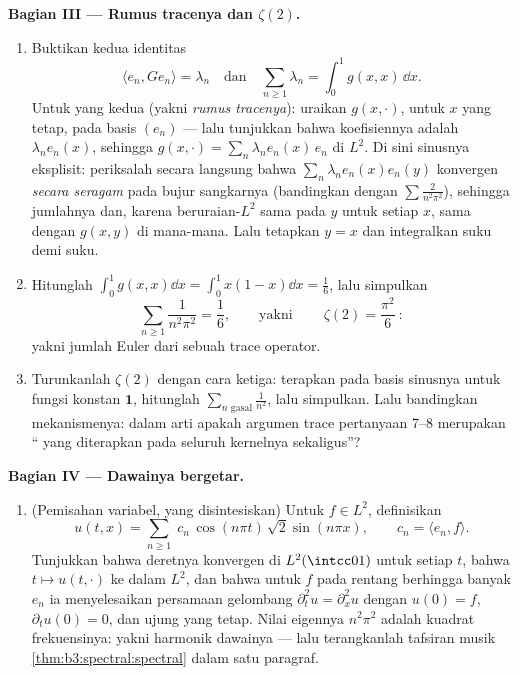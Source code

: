 \begin{problem}
\medskip
\noindent\textbf{Bagian III --- Rumus tracenya dan
$\zeta(2)$.}
\begin{enumerate}[resume]
  \item Buktikan kedua identitas
        \[
        \langle e_n, Ge_n\rangle = \lambda_n
        \quad\text{dan}\quad
        \sum_{n\geq1}\lambda_n = \int_0^1 g(x,x)\,\dd x .
        \]
        Untuk yang kedua (yakni \emph{rumus tracenya}): uraikan
        $g(x, \cdot)$, untuk $x$ yang tetap, pada basis $(e_n)$ ---
        lalu tunjukkan bahwa koefisiennya adalah $\lambda_ne_n(x)$, sehingga
        $g(x, \cdot) = \sum_n\lambda_ne_n(x)\,e_n$ di
        $L^2$. Di sini sinusnya eksplisit: periksalah secara langsung
        bahwa $\sum_n\lambda_ne_n(x)e_n(y)$ konvergen
        \emph{secara seragam} pada bujur sangkarnya (bandingkan dengan $\sum
        \frac2{n^2\pi^2}$), sehingga jumlahnya  dan, karena
        beruraian-$L^2$ sama pada $y$ untuk setiap $x$, sama dengan
        $g(x,y)$ di mana-mana. Lalu tetapkan $y = x$ dan integralkan suku demi
        suku.
  \item Hitunglah $\int_0^1g(x,x)\dd x = \int_0^1x(1-x)\dd x =
        \frac16$, lalu simpulkan
        \[
        \sum_{n\geq1}\frac{1}{n^2\pi^2} = \frac16,
        \qquad\text{yakni}\qquad
        \boxed{\ \zeta(2) = \frac{\pi^2}{6}\ } :
        \]
        yakni jumlah Euler dari sebuah trace operator.
  \item Turunkanlah $\zeta(2)$ dengan cara ketiga: terapkan  pada
        basis sinusnya untuk fungsi konstan $\mathbf 1$,
        hitunglah $\sum_{n \text{ gasal}}\frac1{n^2}$, lalu
        simpulkan. Lalu bandingkan mekanismenya: dalam arti apakah
        argumen trace pertanyaan 7--8 merupakan ``
        yang diterapkan pada seluruh kernelnya sekaligus''?
\end{enumerate}

\medskip
\noindent\textbf{Bagian IV --- Dawainya bergetar.}
\begin{enumerate}[resume]
  \item (Pemisahan variabel, yang disintesiskan) Untuk $f \in
        L^2$, definisikan
        \[
        u(t, x) = \sum_{n\geq1}\;c_n\,
        \cos(n\pi t)\,\sqrt2\sin(n\pi x),
        \qquad c_n = \langle e_n, f\rangle .
        \]
        Tunjukkan bahwa deretnya konvergen di $L^2(\intcc01)$ untuk setiap
        $t$, bahwa $t\mapsto u(t, \cdot)$  ke dalam
        $L^2$, dan bahwa untuk $f$ pada rentang berhingga banyak
        $e_n$ ia menyelesaikan persamaan gelombang $\partial_t^2u =
        \partial_x^2u$ dengan $u(0) = f$, $\partial_tu(0) = 0$,
        dan ujung yang tetap. Nilai eigennya $n^2\pi^2$ adalah kuadrat
        frekuensinya: yakni harmonik dawainya --- lalu terangkanlah
        tafsiran musik \cref{thm:b3:spectral:spectral} dalam satu paragraf.
\end{enumerate}


\end{problem}
